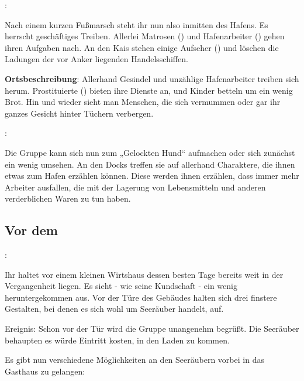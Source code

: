 
:

Nach einem kurzen Fußmarsch steht ihr nun also inmitten des Hafens. Es herrscht geschäftiges Treiben. Allerlei Matrosen (\blue{\ref{Matrosen}}) und Hafenarbeiter (\blue{\ref{Hafenarbeiter}}) gehen ihren Aufgaben nach. An den Kais stehen einige Aufseher (\blue{\ref{Aufseher}}) und löschen die Ladungen der vor Anker liegenden Handelsschiffen.

\textbf{Ortsbeschreibung}: Allerhand Gesindel und unzählige Hafenarbeiter treiben sich herum. Prostituierte (\blue{\ref{Prostituierte}}) bieten ihre Dienste an, und Kinder betteln um ein wenig Brot. Hin und wieder sieht man Menschen, die sich vermummen oder gar ihr ganzes Gesicht hinter Tüchern verbergen.

:

Die Gruppe kann sich nun zum „Gelockten Hund“ aufmachen oder sich zunächst ein wenig umsehen. An den Docks treffen sie auf allerhand Charaktere, die ihnen etwas zum Hafen erzählen können.
Diese werden ihnen erzählen, dass immer mehr Arbeiter ausfallen, die mit der Lagerung von Lebensmitteln und anderen verderblichen Waren zu tun haben.

\subsection*{Vor dem }
\label{vorhund}

:

Ihr haltet vor einem kleinen Wirtshaus dessen besten Tage bereits weit in der Vergangenheit liegen. Es sieht - wie seine Kundschaft - ein wenig heruntergekommen aus. Vor der Türe des Gebäudes halten sich drei finstere Gestalten, bei denen es sich wohl um Seeräuber handelt, auf.

Ereignis: Schon vor der Tür wird die Gruppe unangenehm begrüßt. Die Seeräuber behaupten es würde Eintritt kosten, in den Laden zu kommen.

Es gibt nun verschiedene Möglichkeiten an den Seeräubern vorbei in das Gasthaus zu gelangen:

